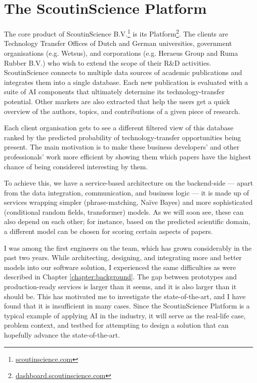 \chapter{The ScoutinScience Platform} \label{chapter:case}

The core product of ScoutinScience B.V.\footnote{\href{https://scoutinscience.com/}{scoutinscience.com}} is its Platform\footnote{\href{https://dashboard.scoutinscience.com/}{dashboard.scoutinscience.com}}. The clients are Technology Transfer Offices of Dutch and German universities, government organisations (e.g. Wetsus), and corporations (e.g. Heraeus Group and Ruma Rubber B.V.) who wish to extend the scope of their R\&D activities. ScoutinScience connects to multiple data sources of academic publications and integrates them into a single database. Each new publication is evaluated with a suite of AI components that ultimately determine its technology-transfer potential. Other markers are also extracted that help the users get a quick overview of the authors, topics, and contributions of a given piece of research.

Each client organisation gets to see a different filtered view of this database ranked by the predicted probability of technology-transfer opportunities being present. The main motivation is to make these business developers' and other professionals' work more efficient by showing them which papers have the highest chance of being considered interesting by them. 

To achieve this, we have a service-based architecture \cite{kleppmann2017designing} on the backend-side --- apart from the data integration, communication, and business logic --- it is made up of services wrapping simpler (phrase-matching, Naïve Bayes) and more sophisticated (conditional random fields, transformer) models. As we will soon see, these can also depend on each other; for instance, based on the predicted scientific domain, a different model can be chosen for scoring certain aspects of papers.

I was among the first engineers on the team, which has grown considerably in the past two years. While architecting, designing, and integrating more and better models into our software solution, I experienced the same difficulties as were described in Chapter \ref{chapter:background}. The gap between prototypes and production-ready services is larger than it seems, and it is also larger than it should be. This has motivated me to investigate the state-of-the-art, and I have found that it is insufficient in many cases. Since the ScoutinScience Platform is a typical example of applying AI in the industry, it will serve as the real-life case, problem context, and testbed for attempting to design a solution that can hopefully advance the state-of-the-art.

